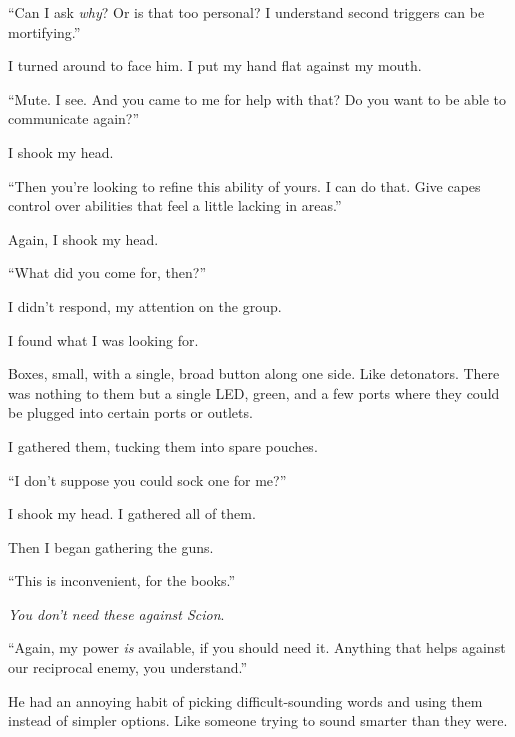 ``Can I ask \emph{why}?  Or is that too personal?  I understand second triggers can be mortifying.''



I turned around to face him.  I put my hand flat against my mouth.



``Mute.  I see.  And you came to me for help with that?  Do you want to be able to communicate again?''



I shook my head.



``Then you're looking to refine this ability of yours.  I can do that.  Give capes control over abilities that feel a little lacking in areas.''



Again, I shook my head.



``What did you come for, then?''



I didn't respond, my attention on the group.



I found what I was looking for.



Boxes, small, with a single, broad button along one side.  Like detonators.  There was nothing to them but a single LED, green, and a few ports where they could be plugged into certain ports or outlets.



I gathered them, tucking them into spare pouches.



``I don't suppose you could sock one for me?''



I shook my head.  I gathered all of them.



Then I began gathering the guns.



``This is inconvenient, for the books.''



\emph{You don't need these against Scion}.



``Again, my power \emph{is} available, if you should need it.  Anything that helps against our reciprocal enemy, you understand.''



He had an annoying habit of picking difficult-sounding words and using them instead of simpler options.  Like someone trying to sound smarter than they were.



